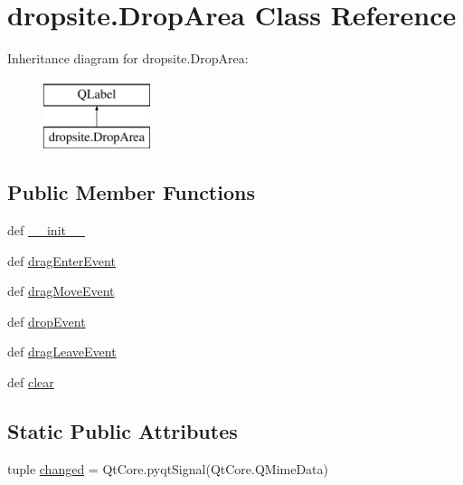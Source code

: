 \hypertarget{classdropsite_1_1DropArea}{}\section{dropsite.\+Drop\+Area Class Reference}
\label{classdropsite_1_1DropArea}
Inheritance diagram for dropsite.\+Drop\+Area\+:\begin{figure}[H]
\begin{center}
\leavevmode
\includegraphics[height=2.000000cm]{classdropsite_1_1DropArea}
\end{center}
\end{figure}
\subsection*{Public Member Functions}
\begin{DoxyCompactItemize}
\item 
def \hyperlink{classdropsite_1_1DropArea_a09585d280756d78c67c9a73b90131122}{\+\_\+\+\_\+init\+\_\+\+\_\+}
\item 
def \hyperlink{classdropsite_1_1DropArea_a1852ec7615390aca8bf64cdae3c48747}{drag\+Enter\+Event}
\item 
def \hyperlink{classdropsite_1_1DropArea_aaca13fac9617dabb287b971a19ee3527}{drag\+Move\+Event}
\item 
def \hyperlink{classdropsite_1_1DropArea_a5acde0d6265a00eaef144288f4755321}{drop\+Event}
\item 
def \hyperlink{classdropsite_1_1DropArea_aa32ab4c1ca0a57e43d3e0234e92970a1}{drag\+Leave\+Event}
\item 
def \hyperlink{classdropsite_1_1DropArea_adfba65b2dd0f49c6b060545263dda32e}{clear}
\end{DoxyCompactItemize}
\subsection*{Static Public Attributes}
\begin{DoxyCompactItemize}
\item 
tuple \hyperlink{classdropsite_1_1DropArea_a1c55c7c459f11c9a25e0c78d895a165e}{changed} = Qt\+Core.\+pyqt\+Signal(Qt\+Core.\+Q\+Mime\+Data)
\end{DoxyCompactItemize}


